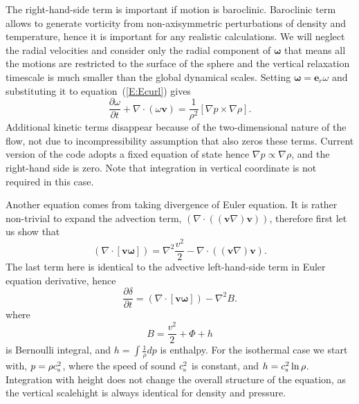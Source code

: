 \documentclass[usenatbib,onecolumn]{mnras}
\renewcommand{\vector}[1]{\ensuremath{\mathbf{#1}}}
\newcommand{\pardir}[2]{\ensuremath{\frac{\partial #2}{\partial #1} }}
\begin{document}
The right-hand-side term is important if motion is baroclinic. Baroclinic term
allows to generate vorticity from non-axisymmetric perturbations of density
and temperature, hence it is important for any realistic calculations. We will
neglect the radial velocities and consider only the radial component of
$\vector{\omega}$ that means all the motions are restricted to the surface of
the sphere and the vertical relaxation timescale is much smaller than the
global dynamical scales. Setting $\vector{\omega} = \vector{e}_r \omega$ and
substituting it to equation~(\ref{E:Ecurl}) gives
\begin{equation}\label{E:Ecurl:r}
\displaystyle  \pardir{t}{\omega} + \nabla \cdot (\omega \vector{v}) =
\frac{1}{\rho^2}\left[\nabla p \times \nabla \rho \right].
\end{equation}
Additional kinetic terms disappear because of the two-dimensional nature of
the flow, not due to incompressibility assumption that also zeros these
terms. Current version of the code adopts a fixed equation of state hence
$\nabla p \propto \nabla \rho $, and the right-hand side is zero. Note that
integration in vertical coordinate is not required in this case. 

Another equation comes from taking divergence of Euler equation. It is rather
non-trivial to expand the advection term, $(\nabla \cdot
((\vector{v}\nabla)\vector{v}))$, therefore first let us show that
\begin{equation}\label{E:vomega}
\left(\nabla \cdot \left[ \vector{v} \vector{\omega}\right] \right) = 
 \nabla^2\frac{v^2}{2} - \nabla \cdot \left((\vector{v}\nabla)\vector{v}\right).
\end{equation}
The last term here is identical to the advective left-hand-side term in Euler
equation derivative, hence
\begin{equation}\label{E:delta}
\pardir{t}{\delta} = \left(\nabla \cdot \left[ \vector{v}
  \vector{\omega}\right] \right) -  \nabla^2 B.
\end{equation}
where
\begin{equation}\label{E:Bernoulli}
B = \frac{v^2}{2} + \Phi + h
\end{equation}
is Bernoulli integral, and $h = \int \frac{1}{\rho}dp$ is enthalpy. For the
isothermal case we start with, $p =  \rho c_{\rm s}^2$, where the speed of
sound $c_{\rm s}^2$ is constant, and $h= c_{\rm s}^2 \ln\rho$. Integration
with height does not change the overall structure of the equation, as the
vertical scalehight is always identical for density and pressure. 
\end{document}
